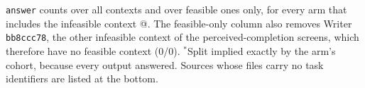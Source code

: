 \begin{table}[h]
\centering\scriptsize
\resizebox{\linewidth}{!}{}
\caption{\fsp{} \texttt{answer} counts over all \fsp{} contexts and over feasible ones only, for every arm that includes the infeasible context \texttt{\infTask}@\infStep. The feasible-only column also removes Writer \texttt{bb8ccc78}, the other infeasible context of the perceived-completion screens, which therefore have no feasible \fsp{} context (0/0). $^{*}$Split implied exactly by the arm's cohort, because every \fsp{} output answered. Sources whose files carry no task identifiers are listed at the bottom.}
\label{tab:infeasible}
\end{table}
\FloatBarrier
